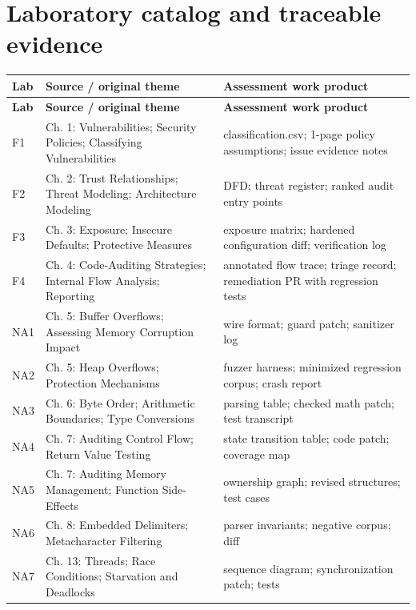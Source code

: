 \documentclass[10pt,letterpaper]{article}
\begin{document}
\section{Laboratory catalog and traceable evidence}
\begingroup\footnotesize\setlength\tabcolsep{3pt}
\begin{longtable}{>{\raggedright\arraybackslash}p{}>{\raggedright\arraybackslash}p{}>{\raggedright\arraybackslash}p{}}\toprule
\textbf{Lab} & \textbf{Source / original theme} & \textbf{Assessment work product}\\\midrule\endfirsthead
\toprule \textbf{Lab} & \textbf{Source / original theme} & \textbf{Assessment work product}\\\midrule\endhead
F1 & Ch. 1: Vulnerabilities; Security Policies; Classifying Vulnerabilities & classification.csv; 1-page policy assumptions; issue evidence notes\\\midrule
F2 & Ch. 2: Trust Relationships; Threat Modeling; Architecture Modeling & DFD; threat register; ranked audit entry points\\\midrule
F3 & Ch. 3: Exposure; Insecure Defaults; Protective Measures & exposure matrix; hardened configuration diff; verification log\\\midrule
F4 & Ch. 4: Code-Auditing Strategies; Internal Flow Analysis; Reporting & annotated flow trace; triage record; remediation PR with regression tests\\\midrule
NA1 & Ch. 5: Buffer Overflows; Assessing Memory Corruption Impact & wire format; guard patch; sanitizer log\\\midrule
NA2 & Ch. 5: Heap Overflows; Protection Mechanisms & fuzzer harness; minimized regression corpus; crash report\\\midrule
NA3 & Ch. 6: Byte Order; Arithmetic Boundaries; Type Conversions & parsing table; checked math patch; test transcript\\\midrule
NA4 & Ch. 7: Auditing Control Flow; Return Value Testing & state transition table; code patch; coverage map\\\midrule
NA5 & Ch. 7: Auditing Memory Management; Function Side-Effects & ownership graph; revised structures; test cases\\\midrule
NA6 & Ch. 8: Embedded Delimiters; Metacharacter Filtering & parser invariants; negative corpus; diff\\\midrule
NA7 & Ch. 13: Threads; Race Conditions; Starvation and Deadlocks & sequence diagram; synchronization patch; tests\\\midrule

\end{longtable}
\end{document}
